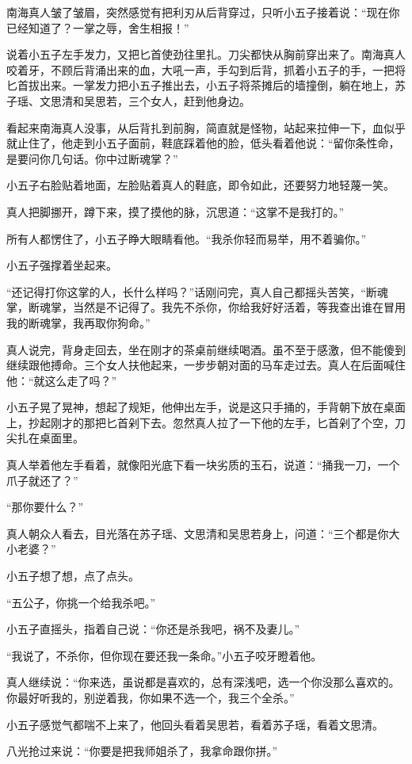 南海真人皱了皱眉，突然感觉有把利刃从后背穿过，只听小五子接着说：“现在你已经知道了？一掌之辱，舍生相报！”

说着小五子左手发力，又把匕首使劲往里扎。刀尖都快从胸前穿出来了。南海真人咬着牙，不顾后背涌出来的血，大吼一声，手勾到后背，抓着小五子的手，一把将匕首拔出来。一掌发力把小五子推出去，小五子将茶摊后的墙撞倒，躺在地上，苏子瑶、文思清和吴思若，三个女人，赶到他身边。

看起来南海真人没事，从后背扎到前胸，简直就是怪物，站起来拉伸一下，血似乎就止住了，他走到小五子面前，鞋底踩着他的脸，低头看着他说：“留你条性命，是要问你几句话。你中过断魂掌？”

小五子右脸贴着地面，左脸贴着真人的鞋底，即令如此，还要努力地轻蔑一笑。

真人把脚挪开，蹲下来，摸了摸他的脉，沉思道：“这掌不是我打的。”

所有人都愣住了，小五子睁大眼睛看他。“我杀你轻而易举，用不着骗你。”

小五子强撑着坐起来。

“还记得打你这掌的人，长什么样吗？”话刚问完，真人自己都摇头苦笑，“断魂掌，断魂掌，当然是不记得了。我先不杀你，你给我好好活着，等我查出谁在冒用我的断魂掌，我再取你狗命。”

真人说完，背身走回去，坐在刚才的茶桌前继续喝酒。虽不至于感激，但不能傻到继续跟他搏命。三个女人扶他起来，一步步朝对面的马车走过去。真人在后面喊住他：“就这么走了吗？”

小五子晃了晃神，想起了规矩，他伸出左手，说是这只手捅的，手背朝下放在桌面上，抄起刚才的那把匕首剁下去。忽然真人拉了一下他的左手，匕首剁了个空，刀尖扎在桌面里。

真人举着他左手看着，就像阳光底下看一块劣质的玉石，说道：“捅我一刀，一个爪子就还了？”

“那你要什么？”

真人朝众人看去，目光落在苏子瑶、文思清和吴思若身上，问道：“三个都是你大小老婆？”

小五子想了想，点了点头。

“五公子，你挑一个给我杀吧。”

小五子直摇头，指着自己说：“你还是杀我吧，祸不及妻儿。”

“我说了，不杀你，但你现在要还我一条命。”小五子咬牙瞪着他。

真人继续说：“你来选，虽说都是喜欢的，总有深浅吧，选一个你没那么喜欢的。你最好听我的，别逆着我，你如果不选一个，我三个全杀。”

小五子感觉气都喘不上来了，他回头看着吴思若，看着苏子瑶，看着文思清。

八光抢过来说：“你要是把我师姐杀了，我拿命跟你拼。”

